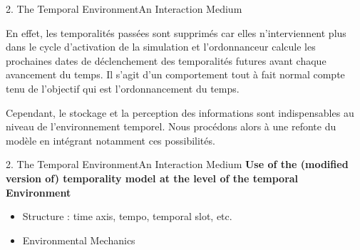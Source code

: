 \begin{frame}{2. The Temporal Environment}{An Interaction Medium}
{{\par En effet, les temporalités passées sont supprimés car elles n'interviennent plus dans le cycle d'activation de la simulation et l'ordonnanceur calcule les prochaines dates de déclenchement des temporalités futures avant chaque avancement du temps. Il s'agit d'un comportement tout à fait normal compte tenu de l'objectif qui est l'ordonnancement du temps.
\par Cependant, le stockage et la perception des informations sont indispensables au niveau de l'environnement temporel. Nous procédons alors à une refonte du modèle en intégrant notamment ces possibilités.

}
}
\end{frame}

\begin{frame}{2. The Temporal Environment}{An Interaction Medium}
\textbf{Use of the (modified version of) temporality model at the level of the \alert{temporal Environment}}
\begin{itemize}
    \item Structure : time axis, tempo, temporal slot, etc.
    \item Environmental Mechanics
\end{itemize}
\begin{table}[]
\end{table}
\end{frame}
